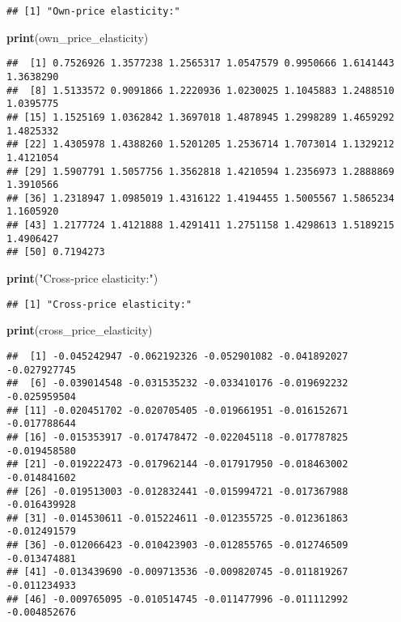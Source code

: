 \documentclass[
]{article}
\newenvironment{Shaded}{\begin{snugshade}}{\end{snugshade}}
\newcommand{\FunctionTok}[1]{\textcolor[rgb]{0.13,0.29,0.53}{\textbf{#1}}}
\newcommand{\NormalTok}[1]{#1}
\newcommand{\StringTok}[1]{\textcolor[rgb]{0.31,0.60,0.02}{#1}}
\begin{document}
\begin{verbatim}
## [1] "Own-price elasticity:"
\end{verbatim}

\begin{Shaded}
\begin{Highlighting}[]
\FunctionTok{print}\NormalTok{(own\_price\_elasticity)}
\end{Highlighting}
\end{Shaded}

\begin{verbatim}
##  [1] 0.7526926 1.3577238 1.2565317 1.0547579 0.9950666 1.6141443 1.3638290
##  [8] 1.5133572 0.9091866 1.2220936 1.0230025 1.1045883 1.2488510 1.0395775
## [15] 1.1525169 1.0362842 1.3697018 1.4878945 1.2998289 1.4659292 1.4825332
## [22] 1.4305978 1.4388260 1.5201205 1.2536714 1.7073014 1.1329212 1.4121054
## [29] 1.5907791 1.5057756 1.3562818 1.4210594 1.2356973 1.2888869 1.3910566
## [36] 1.2318947 1.0985019 1.4316122 1.4194455 1.5005567 1.5865234 1.1605920
## [43] 1.2177724 1.4121888 1.4291411 1.2751158 1.4298613 1.5189215 1.4906427
## [50] 0.7194273
\end{verbatim}

\begin{Shaded}
\begin{Highlighting}[]
\FunctionTok{print}\NormalTok{(}\StringTok{"Cross{-}price elasticity:"}\NormalTok{)}
\end{Highlighting}
\end{Shaded}

\begin{verbatim}
## [1] "Cross-price elasticity:"
\end{verbatim}

\begin{Shaded}
\begin{Highlighting}[]
\FunctionTok{print}\NormalTok{(cross\_price\_elasticity)}
\end{Highlighting}
\end{Shaded}

\begin{verbatim}
##  [1] -0.045242947 -0.062192326 -0.052901082 -0.041892027 -0.027927745
##  [6] -0.039014548 -0.031535232 -0.033410176 -0.019692232 -0.025959504
## [11] -0.020451702 -0.020705405 -0.019661951 -0.016152671 -0.017788644
## [16] -0.015353917 -0.017478472 -0.022045118 -0.017787825 -0.019458580
## [21] -0.019222473 -0.017962144 -0.017917950 -0.018463002 -0.014841602
## [26] -0.019513003 -0.012832441 -0.015994721 -0.017367988 -0.016439928
## [31] -0.014530611 -0.015224611 -0.012355725 -0.012361863 -0.012491579
## [36] -0.012066423 -0.010423903 -0.012855765 -0.012746509 -0.013474881
## [41] -0.013439690 -0.009713536 -0.009820745 -0.011819267 -0.011234933
## [46] -0.009765095 -0.010514745 -0.011477996 -0.011112992 -0.004852676
\end{verbatim}
\end{document}
